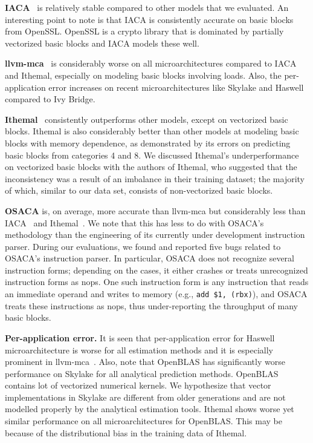  
 \textbf{IACA}~\cite{iaca} is relatively stable compared to other models that we evaluated.
An interesting point to note is that IACA is consistently accurate on basic blocks from OpenSSL. 
OpenSSL is a crypto library that is dominated by partially vectorized basic blocks
and IACA models these well. 

    \textbf{llvm-mca}~\cite{llvm-mca} is considerably worse on all microarchitectures compared to IACA and Ithemal,
especially on modeling basic blocks involving loads. Also, the per-application error increases on recent microarchitectures like Skylake and Haswell compared to Ivy Bridge.

\textbf{Ithemal}~\cite{ithemal} consistently outperforms other models, except on vectorized basic blocks.
Ithemal is also considerably better than other models at modeling basic blocks with memory dependence,
as demonstrated by its errors on predicting basic blocks from categories 4 and 8.
We discussed Ithemal's underperformance on vectorized basic blocks with the authors of Ithemal, who suggested that the inconsistency
was a result of an imbalance in their training dataset;
the majority of which, similar to our data set, consists of non-vectorized basic blocks.

\textbf{OSACA}\cite{osaca} is, on average, more accurate than llvm-mca but
considerably less than IACA~\cite{iaca} and Ithemal~\cite{ithemal}.
We note that this has less to do with OSACA's methodology than the engineering of its currently under development instruction parser.
During our evaluations, we found and reported five bugs related to OSACA's instruction parser.
In particular, OSACA does not recognize several instruction forms;
depending on the cases, it either crashes or treats unrecognized instruction forms as nops.
One such instruction form is any instruction that reads an immediate operand and writes to memory
(e.g., \verb|add $1, (rbx)|), and OSACA treats these instructions as nops, thus under-reporting the throughput of
many basic blocks.

\textbf{Per-application error.} It is seen that per-application error for Haswell microarchitecture is worse for all estimation methods and it is especially prominent in llvm-mca~\cite{llvm-mca}. Also, note that OpenBLAS has significantly worse performance on Skylake for all analytical prediction methods. OpenBLAS contains lot of vectorized numerical kernels. We hypothesize that vector implementations in Skylake are different from older generations and are not modelled properly by the analytical estimation tools. Ithemal shows worse yet  similar performance on all microarchitectures for OpenBLAS. This may be because of the distributional bias in the training data of Ithemal.

